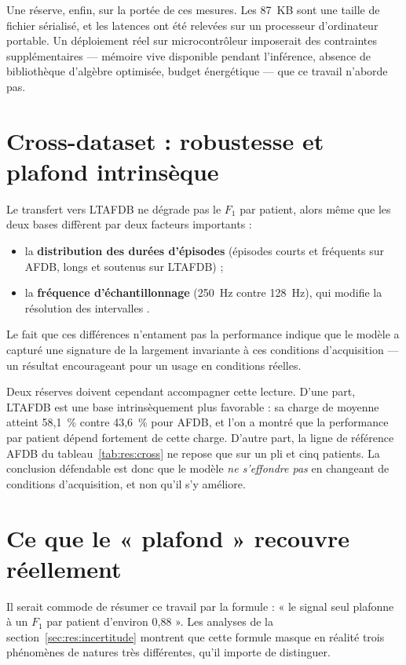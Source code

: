 Une réserve, enfin, sur la portée de ces mesures. Les 87~KB sont une taille de fichier sérialisé, et les latences ont été relevées sur un processeur d'ordinateur portable. Un déploiement réel sur microcontrôleur imposerait des contraintes supplémentaires — mémoire vive disponible pendant l'inférence, absence de bibliothèque d'algèbre optimisée, budget énergétique — que ce travail n'aborde pas.

\section{Cross-dataset : robustesse et plafond intrinsèque}
\label{sec:disc:cross}

Le transfert vers LTAFDB ne dégrade pas le \(F_1\) par patient, alors même que les deux bases diffèrent par deux facteurs importants :
\begin{itemize}
  \item la \textbf{distribution des durées d'épisodes} (épisodes courts et fréquents sur AFDB, longs et soutenus sur LTAFDB) ;
  \item la \textbf{fréquence d'échantillonnage} (250~Hz contre 128~Hz), qui modifie la résolution des intervalles \RR{}.
\end{itemize}
Le fait que ces différences n'entament pas la performance indique que le modèle a capturé une signature de la \FA{} largement invariante à ces conditions d'acquisition — un résultat encourageant pour un usage en conditions réelles.

Deux réserves doivent cependant accompagner cette lecture. D'une part, LTAFDB est une base intrinsèquement plus favorable : sa charge de \FA{} moyenne atteint 58,1~\% contre 43,6~\% pour AFDB, et l'on a montré que la performance par patient dépend fortement de cette charge. D'autre part, la ligne de référence AFDB du tableau~\ref{tab:res:cross} ne repose que sur un pli et cinq patients. La conclusion défendable est donc que le modèle \emph{ne s'effondre pas} en changeant de conditions d'acquisition, et non qu'il s'y améliore.

\section{Ce que le « plafond » recouvre réellement}
\label{sec:disc:plafond}

Il serait commode de résumer ce travail par la formule : « le signal \RR{} seul plafonne à un \(F_1\) par patient d'environ 0,88 ». Les analyses de la section~\ref{sec:res:incertitude} montrent que cette formule masque en réalité trois phénomènes de natures très différentes, qu'il importe de distinguer.

